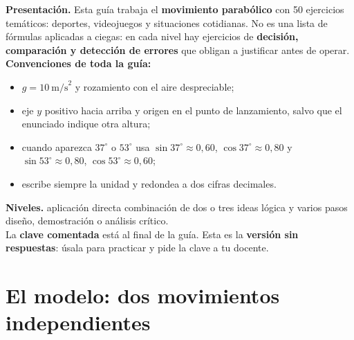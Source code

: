 \documentclass[12pt, letterpaper]{article}
\providecommand{\sen}{\sin}
\begin{document}


\vspace{4pt}
\begin{cuadroinfo}
  \small
  \textbf{Presentación.} Esta guía trabaja el \textbf{movimiento parabólico}
  con 50 ejercicios temáticos: deportes, videojuegos y situaciones
  cotidianas. No es una lista de fórmulas aplicadas a ciegas: en cada nivel
  hay ejercicios de \textbf{decisión, comparación y detección de errores}
  que obligan a justificar antes de operar.
  \\[4pt]
  \textbf{Convenciones de toda la guía:}
  \begin{itemize}[leftmargin=1.2em, nosep, topsep=2pt]
    \item $g=10\ \text{m/s}^2$ y rozamiento con el aire despreciable;
    \item eje $y$ positivo hacia arriba y origen en el punto de lanzamiento,
          salvo que el enunciado indique otra altura;
    \item cuando aparezca $37^\circ$ o $53^\circ$ usa
          $\sen 37^\circ\approx0{,}60$, $\cos 37^\circ\approx0{,}80$ y
          $\sen 53^\circ\approx0{,}80$, $\cos 53^\circ\approx0{,}60$;
    \item escribe siempre la unidad y redondea a dos cifras decimales.
  \end{itemize}
  \par\medskip
  \textbf{Niveles.} \facil\hspace{0.7em}aplicación directa \quad
  \medio\hspace{0.7em}combinación de dos o tres ideas \quad
  \dificil\hspace{0.7em}lógica y varios pasos \quad
  \muyDificil\hspace{0.7em}diseño, demostración o análisis crítico.
  \\[2pt]
  \ifmwclaves
    La \textbf{clave comentada} está al final de la guía.
  \else
    Esta es la \textbf{versión sin respuestas}: úsala para practicar y pide
    la clave a tu docente.
  \fi
\end{cuadroinfo}

\section{El modelo: dos movimientos independientes}
\end{document}
